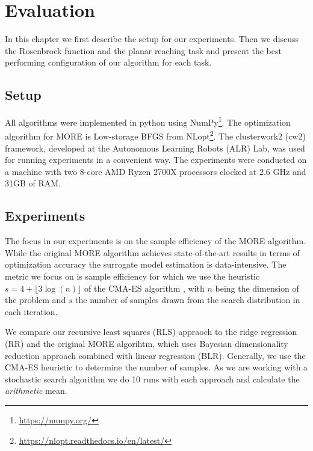 
\chapter{Evaluation}
In this chapter we first describe the setup for our experiments.
Then we discuss the Rosenbrock function and the planar
reaching task and present the best performing
configuration of our algorithm for each task.


\section{Setup}
All algorithms were implemented in python using
NumPy\footnote{\href{https://numpy.org/}{https://numpy.org/}}.
The optimization algorithm for MORE is Low-storage BFGS
from NLopt\footnote{\href{https://nlopt.readthedocs.io/en/latest/}
{https://nlopt.readthedocs.io/en/latest/}}.
The clusterwork2 (cw2) framework, developed at the
Autonomous Learning Robots (ALR) Lab, was used for
running experiments in a convenient way.
The experiments were conducted on a machine with two 8-core
AMD Ryzen 2700X processors clocked at 2.6 GHz and 31GB of RAM.


\section{Experiments}
The focus in our experiments is on the sample efficiency of the
MORE algorithm. While the original MORE algorithm achieves
state-of-the-art results in terms of optimization accuracy
the surrogate model estimation is data-intensive.
The metric we focus on is sample efficiency for which we use the heuristic
$s = 4 + \lfloor 3 \log(n) \rfloor$ of the CMA-ES
algorithm \citep{hansen2016cma}, with $n$ being the dimension
of the problem and $s$ the number of samples drawn from the
search distribution in each iteration.

We compare our recursive least squares (RLS) appraoch
to the ridge regression (RR) and
the original MORE algorihtm, which uses Bayesian dimensionality
reduction approach combined with linear regression (BLR).
Generally, we use the
CMA-ES heuristic to determine the number of samples.
As we are working with a stochastic search algorithm we do
10 runs with each approach and calculate the \textit{arithmetic} mean.

